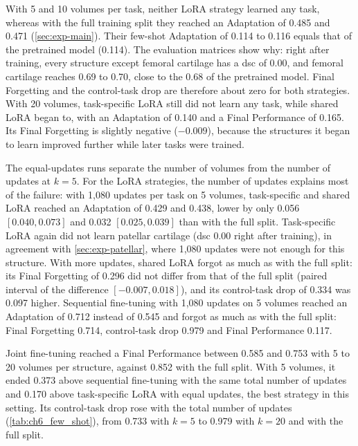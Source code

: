 With 5 and 10 volumes per task, neither LoRA strategy learned any task, whereas with the full training split they reached an Adaptation of 0.485 and 0.471 (\cref{sec:exp-main}).
Their few-shot Adaptation of 0.114 to 0.116 equals that of the pretrained model (0.114).
The evaluation matrices show why: right after training, every structure except femoral cartilage has a \gls{dsc} of 0.00, and femoral cartilage reaches 0.69 to 0.70, close to the 0.68 of the pretrained model.
Final Forgetting and the control-task drop are therefore about zero for both strategies.
With 20 volumes, task-specific LoRA still did not learn any task, while shared LoRA began to, with an Adaptation of 0.140 and a Final Performance of 0.165.
Its Final Forgetting is slightly negative ($-0.009$), because the structures it began to learn improved further while later tasks were trained.

The equal-updates runs separate the number of volumes from the number of updates at $k = 5$.
For the LoRA strategies, the number of updates explains most of the failure: with 1{,}080 updates per task on 5 volumes, task-specific and shared LoRA reached an Adaptation of 0.429 and 0.438, lower by only 0.056 $[0.040, 0.073]$ and 0.032 $[0.025, 0.039]$ than with the full split.
Task-specific LoRA again did not learn patellar cartilage (\gls{dsc} 0.00 right after training), in agreement with \cref{sec:exp-patellar}, where 1{,}080 updates were not enough for this structure.
With more updates, shared LoRA forgot as much as with the full split: its Final Forgetting of 0.296 did not differ from that of the full split (paired interval of the difference $[-0.007, 0.018]$), and its control-task drop of 0.334 was 0.097 higher.
Sequential fine-tuning with 1{,}080 updates on 5 volumes reached an Adaptation of 0.712 instead of 0.545 and forgot as much as with the full split: Final Forgetting 0.714, control-task drop 0.979 and Final Performance 0.117.

Joint fine-tuning reached a Final Performance between 0.585 and 0.753 with 5 to 20 volumes per structure, against 0.852 with the full split.
With 5 volumes, it ended 0.373 above sequential fine-tuning with the same total number of updates and 0.170 above task-specific LoRA with equal updates, the best strategy in this setting.
Its control-task drop rose with the total number of updates (\cref{tab:ch6_few_shot}), from 0.733 with $k = 5$ to 0.979 with $k = 20$ and with the full split.

